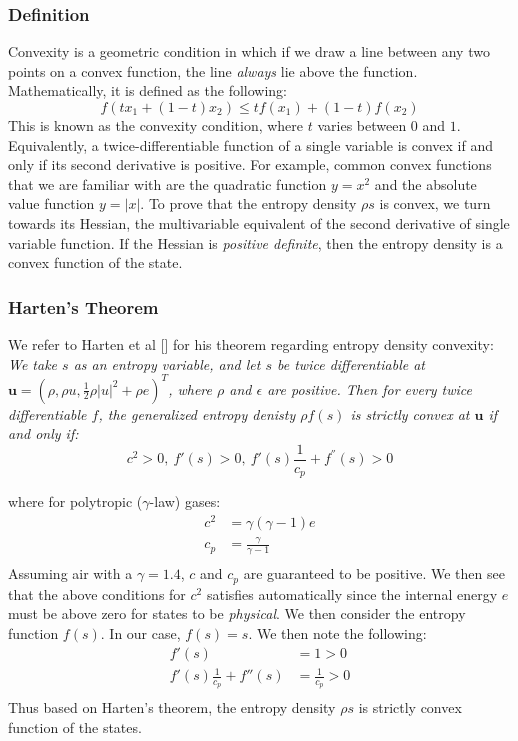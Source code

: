 \documentclass[a4paper]{article}
\numberwithin{equation}{section}
\begin{document}
\subsubsection{Definition}
Convexity is a geometric condition in which if we draw a line between any two points on a convex function, the line \textit{always} lie above the function. Mathematically, it is defined as the following:
\begin{equation}
    f(tx_1 + (1-t)x_2) \leq tf(x_1) + (1-t)f(x_2)
\end{equation}
This is known as the convexity condition, where $t$ varies between $0$ and $1$. Equivalently, a twice-differentiable function of a single variable is convex if and only if its second derivative is positive. For example, common convex functions that we are familiar with are the quadratic function $y = x^2$ and the absolute value function $y = \left| x \right|$.
To prove that the entropy density $\rho s$ is convex, we turn towards its Hessian, the multivariable equivalent of the second derivative of single variable function. If the Hessian is \textit{positive definite}, then the entropy density is a convex function of the state.

\subsubsection{Harten's Theorem}
We refer to Harten et al [] for his theorem regarding entropy density convexity:\textit{
We take $s$ as an entropy variable, and let $s$ be twice differentiable at $\mathbf{u} = (\rho, \rho u, \frac{1}{2}\rho \left|u \right|^2 + \rho e)^T$, where $\rho$ and $\epsilon$ are positive. Then for every twice differentiable $f$, the generalized entropy denisty $\rho f(s)$ is strictly convex at $\mathbf{u}$ if and only if:}
\begin{equation}
    c^2 > 0, \ f'(s) > 0,\  f'(s) \frac{1}{c_p} + f^{''} (s) > 0
\end{equation}

where for polytropic ($\gamma$-law) gases:
\begin{equation}
    \begin{split}
        c^2 &= \gamma(\gamma -1) e\\
        c_p &= \frac{\gamma}{\gamma - 1}\\
    \end{split}
\end{equation}
Assuming air with a $\gamma = 1.4$, $c$ and $c_p$ are guaranteed to be positive. We then see that the above conditions for $c^2$ satisfies automatically since the internal energy $e$ must be above zero for states to be \textit{physical}. We then consider the entropy function $f(s)$. In our case, $f(s) = s$. We then note the following:
\begin{equation}
    \begin{split}
        f'(s) &= 1 > 0\\
        f'(s)\frac{1}{c_p} + f''(s) &= \frac{1}{c_p} > 0\\
    \end{split}
\end{equation}
Thus based on Harten's theorem, the entropy density $\rho s$ is strictly convex function of the states. 
\end{document}
